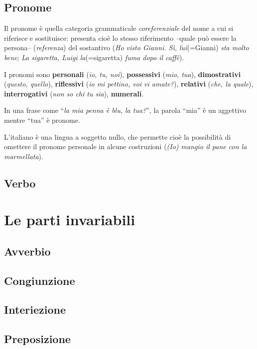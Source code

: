 \documentclass[a4paper,twoside,11pt,chapterprefix=false,bibliography=totocnumbered,listof=flat]{scrbook}
\begin{document}
\subsection{Pronome}\label{pronome}

Il pronome è quella categoria grammaticale \emph{coreferenziale} del
nome a cui si riferisce e sostituisce: presenta cioè lo stesso
riferimento --quale può essere la persona-- (\emph{referenza}) del
sostantivo (\emph{Ho visto Gianni. Sì, lui}(=Gianni) \emph{sta molto
bene}; \emph{La sigaretta, Luigi la}(=sigaretta) \emph{fuma dopo il
caffè}).

I pronomi sono \textbf{personali} (\emph{io, tu, noi}),
\textbf{possessivi} (\emph{mio, tua}), \textbf{dimostrativi}
(\emph{questo, quello}), \textbf{riflessivi} (\emph{io mi pettino, voi
vi amate?}), \textbf{relativi} (\emph{che, la quale}),
\textbf{interrogativi} (\emph{non so chi tu sia}), \textbf{numerali}.

In una frase come \enquote{\emph{la mia penna è blu, la tua?}}, la
parola \enquote{mia} è un aggettivo mentre \enquote{tua} è pronome.

L'italiano è una lingua a soggetto nullo, che permette cioè la
possibilità di omettere il pronome personale in alcune costruzioni
(\emph{(Io) mangio il pane con la marmellata}).

\subsection{Verbo}\label{verbo}

\section{Le parti invariabili}\label{le-parti-invariabili}

\subsection{Avverbio}\label{avverbio}

\subsection{Congiunzione}\label{congiunzione}

\subsection{Interiezione}\label{interiezione}

\subsection{Preposizione}\label{preposizione}
\end{document}
